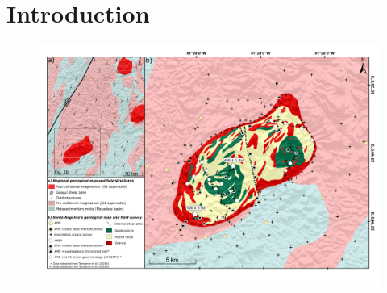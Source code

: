 \section{Introduction}


\begin{figure}[tb!]
  \centering
  \includegraphics[width=1\linewidth]{figures/geology.png}
  \caption{
      }
  \label{euler1}
\end{figure}
